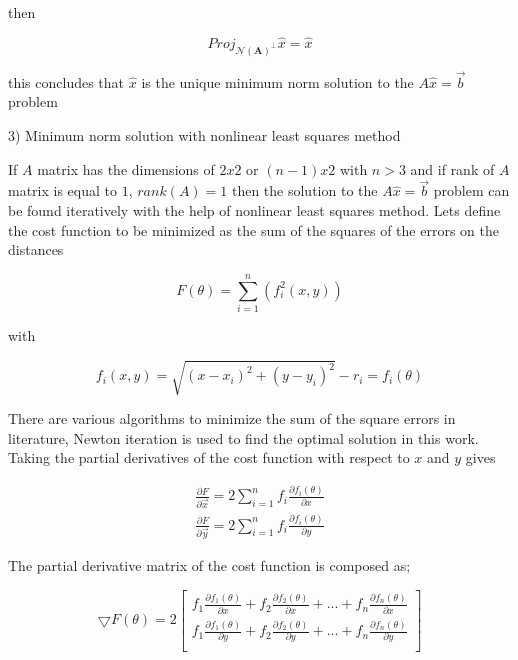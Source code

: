 \documentclass[twoside]{article}
\begin{document}
  then 
  
  \begin{equation}
Proj_{ \mathcal{N}(\mathbf{A})^\perp}\hat{x} = \hat{x}
  \end{equation}
  
  this concludes that $\hat{x}$ is the unique minimum norm solution to the $A\hat{x} = \vec{b}$ problem
	
	
	3) Minimum norm solution with nonlinear least squares method
	
	If $A$ matrix has the dimensions of $2x2$ or $(n-1)x2$ with $n>3$ and if rank of $A$ matrix is equal to $1$, $rank(A) = 1$ then the solution to the $A\hat{x} = \vec{b}$ problem can be found iteratively with the help of nonlinear least squares method. Lets define the cost function to be minimized 	as the sum of the squares of the errors on the distances
	
	\begin{equation}
    F(\theta) = \sum_{i=1}^{n} \left(f_i^2(x,y)\right)
	\end{equation}
	
	with
	
	\begin{equation}
   f_i(x,y) = \sqrt{(x-x_i)^2 + (y - y_i)^2} - r_i = f_i(\theta) 
	\end{equation}

There are various algorithms to minimize the sum of the square errors in literature, Newton iteration is used to find the optimal solution in this work.  Taking the partial derivatives of the cost function with respect to $x$ and $y$ gives 

\begin{align*}
\frac{\partial{F}}{\partial{\vec{x}}} = 2\sum_{i=1}^{n}f_i\frac{\partial{f_i(\theta)}}{\partial{x}} \\
\frac{\partial{F}}{\partial{\vec{y}}} = 2\sum_{i=1}^{n}f_i\frac{\partial{f_i(\theta)}}{\partial{y}}
\end{align*}

The partial derivative matrix of the cost function is composed as;

\begin{equation}
\bigtriangledown{F(\theta)} = 2 
\begin{bmatrix}
f_1\frac{\partial{f_1(\theta)}}{\partial{x}} + f_2\frac{\partial{f_2(\theta)}}{\partial{x}} + ... + f_n\frac{\partial{f_n(\theta)}}{\partial{x}} \\
f_1\frac{\partial{f_1(\theta)}}{\partial{y}} + f_2\frac{\partial{f_2(\theta)}}{\partial{y}} + ... + f_n\frac{\partial{f_n(\theta)}}{\partial{y}} \\
\end{bmatrix}
\end{equation}	
	
\end{document}
